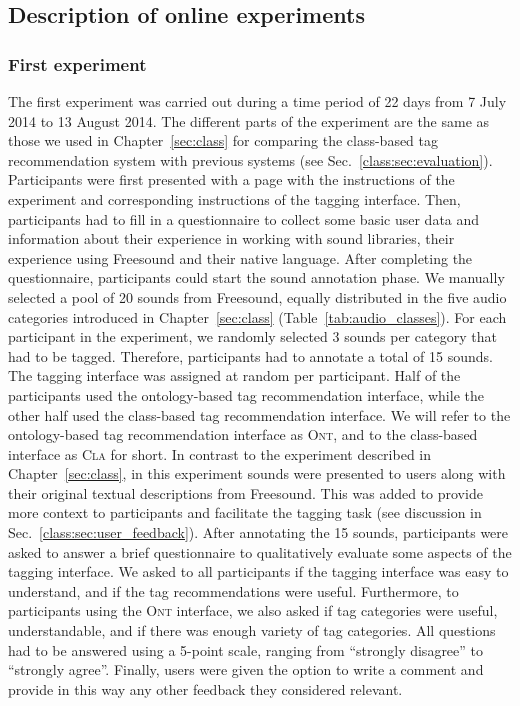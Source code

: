 \subsection{Description of online experiments}
\label{sec:ontology:description_of_online_experiments}

\subsubsection{First experiment}

The first experiment was carried out during a time period of 22 days from 7 July 2014 to 13 August 2014. 
The different parts of the experiment are the same as those we used in Chapter~\ref{sec:class} for comparing the class-based tag recommendation system with previous systems (see Sec.~\ref{class:sec:evaluation}). 
Participants were first presented with a page with the instructions of the experiment and corresponding instructions of the tagging interface.
Then, participants had to fill in a questionnaire to collect some basic user data and information about their experience in working with sound libraries, their experience using Freesound and their native language.
After completing the questionnaire, participants could start the sound annotation phase.
We manually selected a pool of 20 sounds from Freesound, equally distributed in the five audio categories introduced in Chapter~\ref{sec:class} (Table~\ref{tab:audio_classes}). 
For each participant in the experiment, we randomly selected 3 sounds per category that had to be tagged. Therefore, participants had to annotate a total of 15 sounds.
The tagging interface was assigned at random per participant. Half of the participants used the ontology-based tag recommendation interface, while the other half used the class-based tag recommendation interface. We will refer to the ontology-based tag recommendation interface as \textsc{Ont}, and to the class-based interface as \textsc{Cla} for short.
In contrast to the experiment described in Chapter~\ref{sec:class}, in this experiment sounds were presented to users along with their original textual descriptions from Freesound. This was added to provide more context to participants and facilitate the tagging task (see discussion in Sec.~\ref{class:sec:user_feedback}).
After annotating the 15 sounds, participants were asked to answer a brief questionnaire to qualitatively evaluate some aspects of the tagging interface. 
We asked to all participants if the tagging interface was easy to understand, and if the tag recommendations were useful. Furthermore, to participants using the \textsc{Ont} interface, we also asked if tag categories were useful, understandable, and if there was enough variety of tag categories. All questions had to be answered using a 5-point scale, ranging from ``strongly disagree'' to ``strongly agree''. Finally, users were given the option to write a comment and provide in this way any other feedback they considered relevant.

